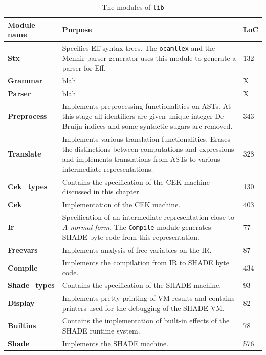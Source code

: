 \documentclass[class=article, crop=false]{standalone}
\begin{document}
\begin{table}[ht]
    \small
    \centering
    {\renewcommand{\arraystretch}{1.3}
    \begin{tabular}{lp{10cm}l}
    \toprule
    \textbf{Module name} & \textbf{Purpose} & \textbf{LoC} \\
    \midrule
    \textbf{Stx} & 
        Specifies Eff syntax trees. The \verb|ocamllex| and the Menhir parser
        generator uses this module to generate a parser for Eff. &
        132 \\
    \textbf{Grammar} &
        blah &
        X \\
    \textbf{Parser} &
        blah &
        X \\
    \textbf{Preprocess} &
        Implements preprocessing functionalities on ASTs. At this stage all
        identifiers are given unique integer De Bruijn indices
        and some syntactic sugars are removed.  &
        343 \\
    \textbf{Translate} &
        Implements various translation functionalities. Erases the distinctions
        between computations and expressions and implements translations from
        ASTs to various intermediate representations. &
        328 \\
    \textbf{Cek\_types} & Contains the specification of the CEK machine
        discussed in this chapter. &
        130 \\
    \textbf{Cek} &
        Implementation of the CEK machine. &
        403 \\
    \textbf{Ir} &
        Specification of an intermediate representation close to \emph{A-normal
        form}. The \verb|Compile| module generates SHADE byte code from this
        representation. &
        77 \\
    \textbf{Freevars} &
        Implements analysis of free variables on the IR. &
        87 \\
    \textbf{Compile} &
        Implements the compilation from IR to SHADE byte code. &
        434 \\
    \textbf{Shade\_types} &
        Contains the specification of the SHADE machine. &
        93 \\
    \textbf{Display} &
        Implements pretty printing of VM results and contains printers used for
        the debugging of the SHADE VM. &
        82 \\
    \textbf{Builtins} &
        Contains the implementation of built-in effects of the SHADE runtime
        system. &
        78 \\
    \textbf{Shade} &
        Implements the SHADE machine. &
        576 \\
    \bottomrule
    \end{tabular}}
    \caption[OCaml modules and their purpose]{The modules of \texttt{lib}}
    \label{tab:lib-modules}
\end{table}
\end{document}
